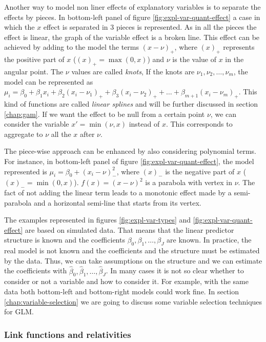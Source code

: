 \documentclass[a4paper, nobind]{templates/ociamthesis}
\theoremstyle{definition}
\theoremstyle{definition}
\theoremstyle{definition}
\theoremstyle{remark}
\begin{document}
Another way to model non liner effects of explanatory variables is to separate the effects by pieces. In bottom-left panel of figure \ref{fig:expl-var-quant-effect} a case in which the \(x\) effect is separated in 3 pieces is represented. As in all the pieces the effect is linear, the graph of the variable effect is a broken line. This effect can be achieved by adding to the model the terms \((x-\nu)_+\), where \((x)_+\) represents the positive part of \(x\) (\((x)_+ = \max(0,x)\)) and \(\nu\) is the value of \(x\) in the angular point. The \(\nu\) values are called \emph{knots}, If the knots are \(\nu_1, \nu_2, \dots, \nu_m\), the model can be represented as \(\mu_i = \beta_0 + \beta_1 x_i + \beta_2 (x_i-\nu_1)_+ + \beta_3 (x_i-\nu_2)_+ + \dots + \beta_{m+1} (x_i-\nu_m)_+\). This kind of functions are called \emph{linear splines} and will be further discussed in section \ref{chap:gam}. If we want the effect to be null from a certain point \(\nu\), we can consider the variable \(x' = \min(\nu, x)\) instead of \(x\). This corresponds to aggregate to \(\nu\) all the \(x\) after \(\nu\).

The piece-wise approach can be enhanced by also considering polynomial terms. For instance, in bottom-left panel of figure \ref{fig:expl-var-quant-effect}, the model represented is \(\mu_i = \beta_0 + \left( x_i - \nu \right)_-^2\), where \((x)_-\) is the negative part of \(x\) (\((x)_- = \min(0,x)\)). \(f(x) = (x-\nu)^2\) is a parabola with vertex in \(\nu\). The fact of not adding the linear term leads to a monotonic effect made by a semi-parabola and a horizontal semi-line that starts from its vertex.

The examples represented in figures \ref{fig:expl-var-types} and \ref{fig:expl-var-quant-effect} are based on simulated data. That means that the linear predictor structure is known and the coefficients \(\beta_0, \beta_1, \dots, \beta_J\) are known. In practice, the real model is not known and the coefficients and the structure must be estimated by the data. Thus, we can take assumptions on the structure and we can estimate the coefficients with \(\hat{\beta}_0, \hat{\beta}_1, \dots, \hat{\beta}_J\). In many cases it is not so clear whether to consider or not a variable and how to consider it. For example, with the same data both bottom-left and bottom-right models could work fine. In section \ref{chap:variable-selection} we are going to discuss some variable selection techniques for GLM.

\hypertarget{link-functions-and-relativities}{%
\subsubsection{Link functions and relativities}\label{link-functions-and-relativities}}
\end{document}
